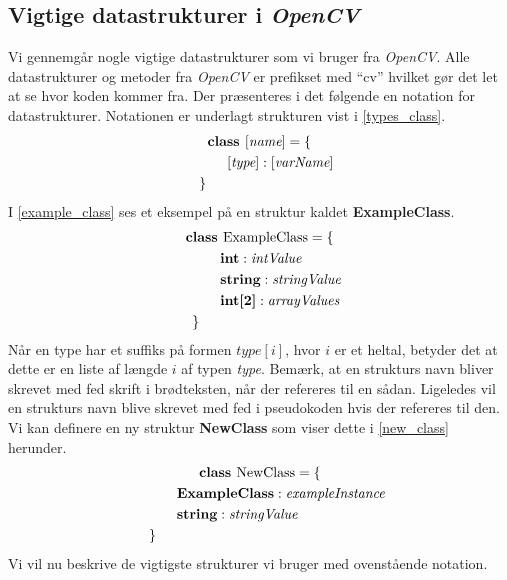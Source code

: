 {\subsection{Vigtige datastrukturer i \emph{OpenCV}}
Vi gennemgår nogle vigtige datastrukturer som vi bruger fra
\emph{OpenCV}.  Alle datastrukturer og metoder fra \emph{OpenCV} er
prefikset med ``cv'' hvilket gør det let at se hvor koden kommer fra.
Der præsenteres i det følgende en notation for datastrukturer.
Notationen er underlagt strukturen vist i
\ref{types_class}.
\begin{multline}
    \textbf{class~} [\textit{name}] = \{ \\
    \shoveleft{\qquad[\textit{type}] : [\textit{varName}]} \\
    \shoveleft{\}}\shoveright{}
    \label{types_class}
\end{multline}
I \ref{example_class} ses et eksempel på en struktur kaldet
\textbf{ExampleClass}.
\begin{multline}
    \textbf{class~} \textrm{ExampleClass} = \{ \\
    \shoveleft{\qquad\textbf{int} : \textit{intValue}} \\
    \shoveleft{\qquad\textbf{string} : \textit{stringValue}} \\
    \shoveleft{\qquad\textbf{int[2]} : \textit{arrayValues}} \\
    \shoveleft{\}}\shoveright{}
    \label{example_class}
\end{multline}
Når en type har et suffiks på formen $\textit{type}[i]$, hvor $i$ er et
heltal, betyder det at dette er en liste af længde $i$ af typen
\textit{type}.  Bemærk, at en strukturs navn bliver skrevet med fed
skrift i brødteksten, når der refereres til en sådan. Ligeledes vil en
strukturs navn blive skrevet med fed i pseudokoden hvis der refereres
til den. Vi kan definere en ny struktur \textbf{NewClass} som viser
dette i
\ref{new_class} herunder.
\begin{multline}
    \textbf{class~} \textrm{NewClass} = \{ \\
    \shoveleft{\qquad\textbf{ExampleClass} : \textit{exampleInstance}} \\
    \shoveleft{\qquad\textbf{string} : \textit{stringValue}} \\
    \shoveleft{\}}\shoveright{}
    \label{new_class}
\end{multline}
Vi vil nu beskrive de vigtigste strukturer vi bruger med ovenstående
notation.

}
